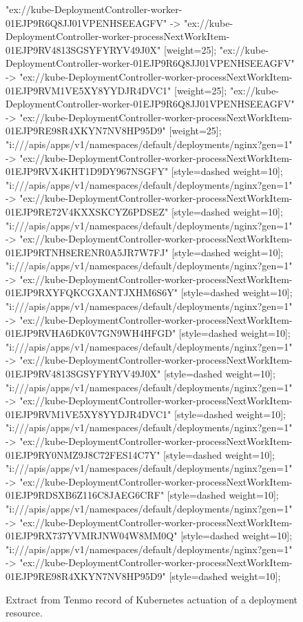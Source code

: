 \begin{figure}[p]
\begin{sideways}
{"ex://kube-DeploymentController-worker-01EJP9R6Q8JJ01VPENHSEEAGFV" -> "ex://kube-DeploymentController-worker-processNextWorkItem-01EJP9RV4813SGSYFYRYV49J0X" [weight=25];
"ex://kube-DeploymentController-worker-01EJP9R6Q8JJ01VPENHSEEAGFV" -> "ex://kube-DeploymentController-worker-processNextWorkItem-01EJP9RVM1VE5XY8YYDJR4DVC1" [weight=25];
"ex://kube-DeploymentController-worker-01EJP9R6Q8JJ01VPENHSEEAGFV" -> "ex://kube-DeploymentController-worker-processNextWorkItem-01EJP9RE98R4XKYN7NV8HP95D9" [weight=25];
"i:///apis/apps/v1/namespaces/default/deployments/nginx?gen=1" -> "ex://kube-DeploymentController-worker-processNextWorkItem-01EJP9RVX4KHT1D9DY967NSGFY" [style=dashed weight=10];
"i:///apis/apps/v1/namespaces/default/deployments/nginx?gen=1" -> "ex://kube-DeploymentController-worker-processNextWorkItem-01EJP9RE72V4KXXSKCYZ6PDSEZ" [style=dashed weight=10];
"i:///apis/apps/v1/namespaces/default/deployments/nginx?gen=1" -> "ex://kube-DeploymentController-worker-processNextWorkItem-01EJP9RTNH8ERENR0A5JR7W7FJ" [style=dashed weight=10];
"i:///apis/apps/v1/namespaces/default/deployments/nginx?gen=1" -> "ex://kube-DeploymentController-worker-processNextWorkItem-01EJP9RXYFQKCGXANTJXHM6S6Y" [style=dashed weight=10];
"i:///apis/apps/v1/namespaces/default/deployments/nginx?gen=1" -> "ex://kube-DeploymentController-worker-processNextWorkItem-01EJP9RVHA6DK0V7GN9WH4HFGD" [style=dashed weight=10];
"i:///apis/apps/v1/namespaces/default/deployments/nginx?gen=1" -> "ex://kube-DeploymentController-worker-processNextWorkItem-01EJP9RV4813SGSYFYRYV49J0X" [style=dashed weight=10];
"i:///apis/apps/v1/namespaces/default/deployments/nginx?gen=1" -> "ex://kube-DeploymentController-worker-processNextWorkItem-01EJP9RVM1VE5XY8YYDJR4DVC1" [style=dashed weight=10];
"i:///apis/apps/v1/namespaces/default/deployments/nginx?gen=1" -> "ex://kube-DeploymentController-worker-processNextWorkItem-01EJP9RY0NMZ9J8C72FES14C7Y" [style=dashed weight=10];
"i:///apis/apps/v1/namespaces/default/deployments/nginx?gen=1" -> "ex://kube-DeploymentController-worker-processNextWorkItem-01EJP9RDSXB6Z116C8JAEG6CRF" [style=dashed weight=10];
"i:///apis/apps/v1/namespaces/default/deployments/nginx?gen=1" -> "ex://kube-DeploymentController-worker-processNextWorkItem-01EJP9RX737YVMRJNW04W8MM0Q" [style=dashed weight=10];
"i:///apis/apps/v1/namespaces/default/deployments/nginx?gen=1" -> "ex://kube-DeploymentController-worker-processNextWorkItem-01EJP9RE98R4XKYN7NV8HP95D9" [style=dashed weight=10];

}
\end{sideways}
    \vspace{-2em}
    \caption{Extract from Tenmo record of Kubernetes actuation of a deployment resource.} 
    \label{fig:k8s-controller-extract}
\end{figure}


